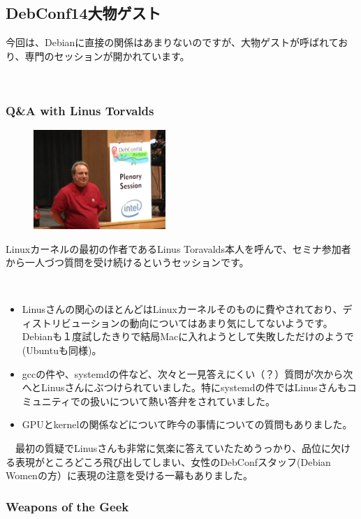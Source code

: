 \documentclass[mingoth,a4paper]{jsarticle}
\begin{document}
\subsection{DebConf14大物ゲスト}

 今回は、Debianに直接の関係はあまりないのですが、大物ゲストが呼ばれており、専門のセッションが開かれています。

　\subsubsection{Q\&A with Linus Torvalds}

\begin{figure}
  \includegraphics[width=5cm]{image201409/qa_linus.png}
\end{figure}

  Linuxカーネルの最初の作者であるLinus Toravalds本人を呼んで、セミナ参加者から一人づつ質問を受け続けるというセッションです。

　\begin{itemize} 
  \item Linusさんの関心のほとんどはLinuxカーネルそのものに費やされており、ディストリビューションの動向についてはあまり気にしてないようです。
Debianも１度試したきりで結局Macに入れようとして失敗しただけのようで(Ubuntuも同様)。
  \item gccの件や、systemdの件など、次々と一見答えにくい（？）質問が次から次へとLinusさんにぶつけられていました。特にsystemdの件ではLinusさんもコミュニティでの扱いについて熱い答弁をされていました。
  \item GPUとkernelの関係などについて昨今の事情についての質問もありました。
  \end{itemize}

　最初の質疑でLinusさんも非常に気楽に答えていたためうっかり、品位に欠ける表現がところどころ飛び出してしまい、女性のDebConfスタッフ(Debian Womenの方）に表現の注意を受ける一幕もありました。

 \subsubsection{Weapons of the Geek} 
\end{document}
